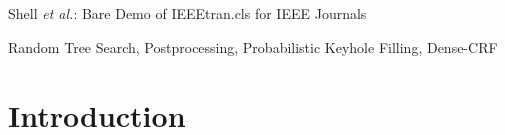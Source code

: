 \documentclass[journal]{IEEEtran}
\begin{document}
%
{Shell \MakeLowercase{\textit{et al.}}: Bare Demo of IEEEtran.cls for IEEE Journals}
% 











\maketitle



\begin{IEEEkeywords}
Random Tree Search, Postprocessing, Probabilistic Keyhole Filling, Dense-CRF
\end{IEEEkeywords}






%
\IEEEpeerreviewmaketitle



\section{Introduction}
% 
% 
% 
% 
\end{document}
